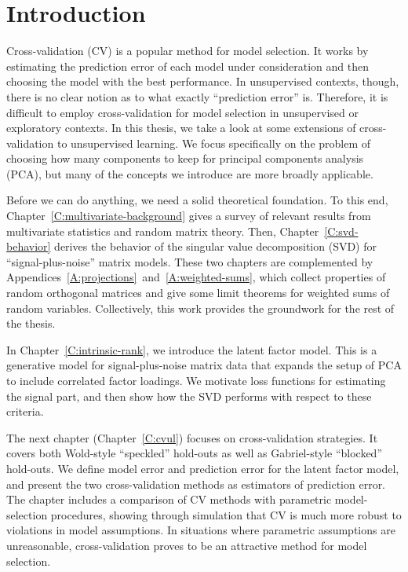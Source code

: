 \chapter{Introduction}

Cross-validation (CV) is a popular method for model selection.  It works by estimating the prediction error of each model under consideration and then choosing the model with the best performance.  In unsupervised contexts, though, there is no clear notion as to what exactly ``prediction error'' is.  Therefore, it is difficult to employ cross-validation for model selection in unsupervised or exploratory contexts.  In this thesis, we take a look at some extensions of cross-validation to unsupervised learning.  We focus specifically on the problem of choosing how many components to keep for principal components analysis (PCA), but many of the concepts we introduce are more broadly applicable.

Before we can do anything, we need a solid theoretical foundation.  To this end, Chapter~\ref{C:multivariate-background} gives a survey of relevant results from multivariate statistics and random matrix theory.  Then, Chapter~\ref{C:svd-behavior} derives the behavior of the singular value decomposition (SVD) for ``signal-plus-noise'' matrix models.  These two chapters are complemented by Appendices~\ref{A:projections}~and~\ref{A:weighted-sums}, which collect properties of random orthogonal matrices and give some limit theorems for weighted sums of random variables.  Collectively, this work provides the groundwork for the rest of the thesis.

In Chapter~\ref{C:intrinsic-rank}, we introduce the latent factor model.  This is a generative model for signal-plus-noise matrix data that expands the setup of PCA to include correlated factor loadings.  We motivate loss functions for estimating the signal part, and then show how the SVD performs with respect to these criteria.  

The next chapter (Chapter~\ref{C:cvul}) focuses on cross-validation strategies.  It covers both Wold-style ``speckled'' hold-outs as well as Gabriel-style ``blocked'' hold-outs.  We define model error and prediction error for the latent factor model, and present the two cross-validation methods as estimators of prediction error.  The chapter includes a comparison of CV methods with parametric model-selection procedures, showing through simulation that CV is much more robust to violations in model assumptions.  In situations where parametric assumptions are unreasonable, cross-validation proves to be an attractive method for model selection.

